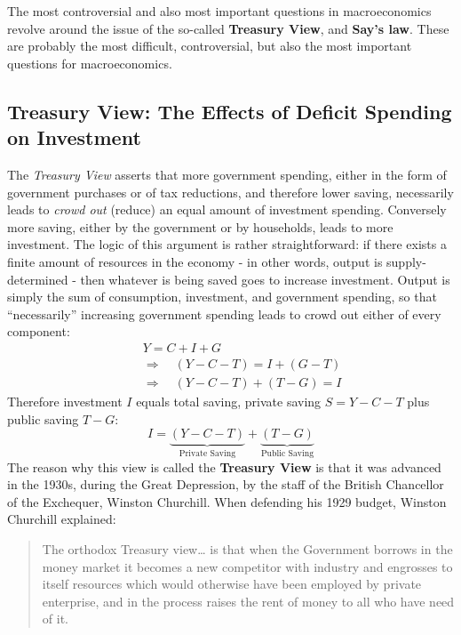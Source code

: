 \documentclass[]{book}
\theoremstyle{definition}
\theoremstyle{definition}
\theoremstyle{definition}
\theoremstyle{remark}
\begin{document}
The most controversial and also most important questions in
macroeconomics revolve around the issue of the so-called
\textbf{Treasury View}, and \textbf{Say's law}. These are probably the
most difficult, controversial, but also the most important questions for
macroeconomics.

\subsection{Treasury View: The Effects of Deficit Spending on
Investment}\label{treasury-view-the-effects-of-deficit-spending-on-investment}

The \emph{Treasury View} asserts that more government spending, either
in the form of government purchases or of tax reductions, and therefore
lower saving, necessarily leads to \emph{crowd out} (reduce) an equal
amount of investment spending. Conversely more saving, either by the
government or by households, leads to more investment. The logic of this
argument is rather straightforward: if there exists a finite amount of
resources in the economy - in other words, output is supply-determined -
then whatever is being saved goes to increase investment. Output is
simply the sum of consumption, investment, and government spending, so
that ``necessarily'' increasing government spending leads to crowd out
either of every component: \[
\begin{aligned}
&Y = C+I+G\\
\quad &  \Rightarrow \quad \left(Y- C-T\right)=I+\left(G-T\right) \\
\quad &  \Rightarrow \quad \left(Y- C-T\right) + \left(T-G\right)=I
\end{aligned}
\] Therefore investment \(I\) equals total saving, private saving
\(S=Y-C-T\) plus public saving \(T-G\):
\[\boxed{I = \underbrace{\left(Y-C-T\right)}_{\text{Private Saving}} + \underbrace{(T-G)}_{\text{Public Saving}}}\]
The reason why this view is called the \textbf{Treasury View} is that it
was advanced in the 1930s, during the Great Depression, by the staff of
the British Chancellor of the Exchequer, Winston Churchill. When
defending his 1929 budget, Winston Churchill explained:

\begin{quote}
The orthodox Treasury view\ldots{} is that when the Government borrows
in the money market it becomes a new competitor with industry and
engrosses to itself resources which would otherwise have been employed
by private enterprise, and in the process raises the rent of money to
all who have need of it.
\end{quote}
\end{document}
